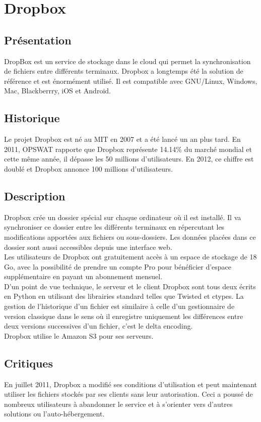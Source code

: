 \chapter{Dropbox}
\thispagestyle{EIP} %
\section{Présentation}
DropBox est un service de stockage dans le cloud qui permet la synchronisation de fichiers entre différents terminaux. Dropbox a longtemps été la solution de référence et est énormément utilisé. Il est compatible avec GNU/Linux, Windows, Mac, Blackberrry, iOS et Android.\\

\section{Historique}
Le projet Dropbox est né au MIT en 2007 et a été lancé un an plus tard. En 2011, OPSWAT rapporte que Dropbox représente 14.14\% du marché mondial et cette même année, il dépasse les 50 millions d'utilisateurs. En 2012, ce chiffre est doublé et Dropbox annonce 100 millions d'utilisateurs.\\

\section{Description}
Dropbox crée un dossier spécial sur chaque ordinateur où il est installé. Il va synchroniser ce dossier entre les différents terminaux en répercutant les modifications apportées aux fichiers ou sous-dossiers. Les données placées dans ce dossier sont aussi accessibles depuis une interface web.\\

Les utilisateurs de Dropbox ont gratuitement accès à un espace de stockage de 18 Go, avec la possibilité de prendre un compte Pro pour bénéficier d'espace supplémentaire en payant un abonnement mensuel.\\

D'un point de vue technique, le serveur et le client Dropbox sont tous deux écrits en Python en utilisant des librairies standard telles que Twisted et ctypes. La gestion de l'historique d'un fichier est similaire à celle d'un gestionnaire de version classique dans le sens où il enregistre uniquement les différences entre deux versions successives d'un fichier, c'est le delta encoding.\\

Dropbox utilise le Amazon S3 pour ses serveurs.\\

\section{Critiques}

En juillet 2011, Dropbox a modifié ses conditions d'utilisation et peut maintenant utiliser les fichiers stockés par ses clients sans leur autorisation. Ceci a poussé de nombreux utilisateurs à abandonner le service et à s'orienter vers d'autres solutions ou l'auto-hébergement.\\
